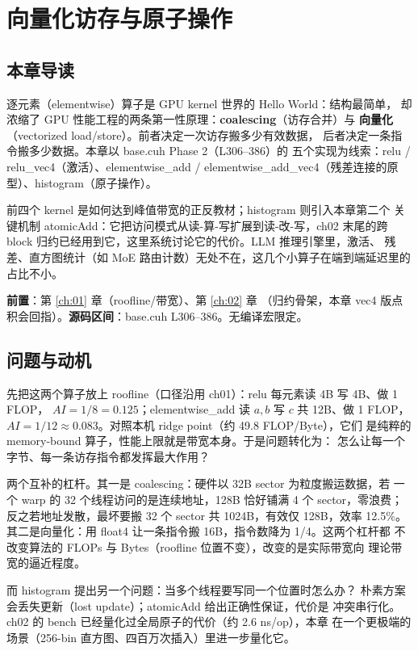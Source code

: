 \chapter{向量化访存与原子操作}\label{ch:03}

\section{本章导读}

逐元素（elementwise）算子是 GPU kernel 世界的 Hello World：结构最简单，
却浓缩了 GPU 性能工程的两条第一性原理：\textbf{coalescing}（访存合并）与
\textbf{向量化}（vectorized load/store）。前者决定一次访存搬多少有效数据，
后者决定一条指令搬多少数据。本章以 base.cuh Phase 2（L306--386）的
五个实现为线索：relu / relu\_vec4（激活）、elementwise\_add /
elementwise\_add\_vec4（残差连接的原型）、histogram（原子操作）。

前四个 kernel 是如何达到峰值带宽的正反教材；histogram 则引入本章第二个
关键机制 atomicAdd：它把访问模式从读-算-写扩展到读-改-写，ch02
末尾的跨 block 归约已经用到它，这里系统讨论它的代价。LLM 推理引擎里，激活、
残差、直方图统计（如 MoE 路由计数）无处不在，这几个小算子在端到端延迟里的
占比不小。

\textbf{前置}：第 \ref{ch:01} 章（roofline/带宽）、第 \ref{ch:02} 章
（归约骨架，本章 vec4 版点积会回指）。\textbf{源码区间}：base.cuh
L306--386。无编译宏限定。

\section{问题与动机}

先把这两个算子放上 roofline（口径沿用 ch01）：relu 每元素读 4B 写 4B、做 1 FLOP，
$AI = 1/8 = 0.125$；elementwise\_add 读 $a,b$ 写 $c$ 共 12B、做 1 FLOP，
$AI = 1/12 \approx 0.083$。对照本机 ridge point（约 49.8 FLOP/Byte），它们
是纯粹的 memory-bound 算子，性能上限就是带宽本身。于是问题转化为：
怎么让每一个字节、每一条访存指令都发挥最大作用？

两个互补的杠杆。其一是 coalescing：硬件以 32B sector 为粒度搬运数据，若
一个 warp 的 32 个线程访问的是连续地址，128B 恰好铺满 4 个 sector，零浪费；
反之若地址发散，最坏要搬 32 个 sector 共 1024B，有效仅 128B，效率 12.5\%。
其二是向量化：用 float4 让一条指令搬 16B，指令数降为 1/4。这两个杠杆都
不改变算法的 FLOPs 与 Bytes（roofline 位置不变），改变的是实际带宽向
理论带宽的逼近程度。

而 histogram 提出另一个问题：当多个线程要写同一个位置时怎么办？
朴素方案会丢失更新（lost update）；atomicAdd 给出正确性保证，代价是
冲突串行化。ch02 的 bench 已经量化过全局原子的代价（约 2.6 ns/op），本章
在一个更极端的场景（256-bin 直方图、四百万次插入）里进一步量化它。

